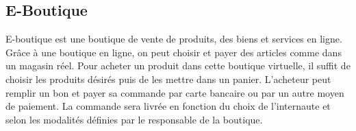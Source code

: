 \subsection{E-Boutique}


E-boutique est une boutique de vente de produits, des biens et services en ligne. Grâce à une boutique en ligne, on peut choisir et payer des articles comme dans un magasin réel. Pour acheter un produit dans cette boutique virtuelle, il suffit de choisir les produits désirés puis de les mettre dans un panier. L’acheteur peut remplir un bon et payer sa commande par carte bancaire ou par un autre moyen de paiement. La commande sera livrée en fonction du choix de l’internaute et selon les modalités définies par le responsable de la boutique.